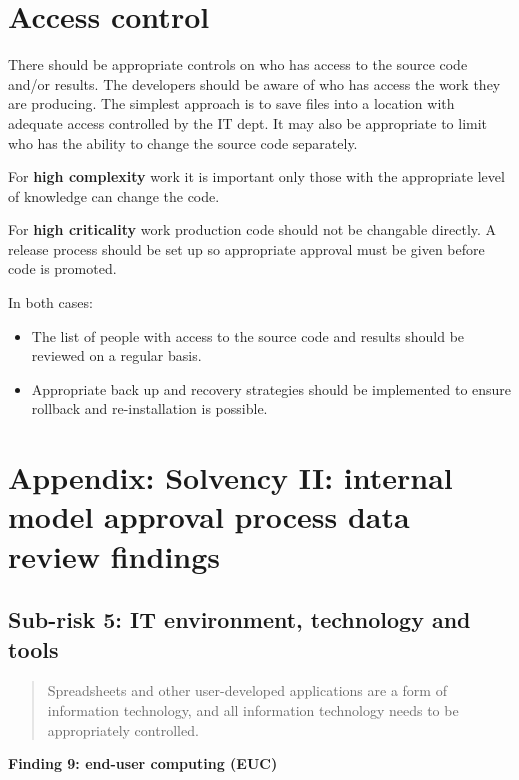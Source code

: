 \documentclass[]{book}
\providecommand{\tightlist}{%
  \setlength{\itemsep}{0pt}\setlength{\parskip}{0pt}}
\theoremstyle{definition}
\theoremstyle{definition}
\theoremstyle{definition}
\theoremstyle{remark}
\begin{document}
\section{Access control}\label{access-control}

There should be appropriate controls on who has access to the source
code and/or results. The developers should be aware of who has access
the work they are producing. The simplest approach is to save files into
a location with adequate access controlled by the IT dept. It may also
be appropriate to limit who has the ability to change the source code
separately.

For \textbf{high complexity} work it is important only those with the
appropriate level of knowledge can change the code.

For \textbf{high criticality} work production code should not be
changable directly. A release process should be set up so appropriate
approval must be given before code is promoted.

In both cases:

\begin{itemize}
\tightlist
\item
  The list of people with access to the source code and results should
  be reviewed on a regular basis.
\item
  Appropriate back up and recovery strategies should be implemented to
  ensure rollback and re-installation is possible.
\end{itemize}

\section{Appendix: Solvency II: internal model approval process data
review
findings}\label{appendix-solvency-ii-internal-model-approval-process-data-review-findings}

\subsection{Sub-risk 5: IT environment, technology and
tools}\label{sub-risk-5-it-environment-technology-and-tools}

\begin{quote}
Spreadsheets and other user-developed applications are a form of
information technology, and all information technology needs to be
appropriately controlled.
\end{quote}

\textbf{Finding 9: end-user computing (EUC)}
\end{document}
